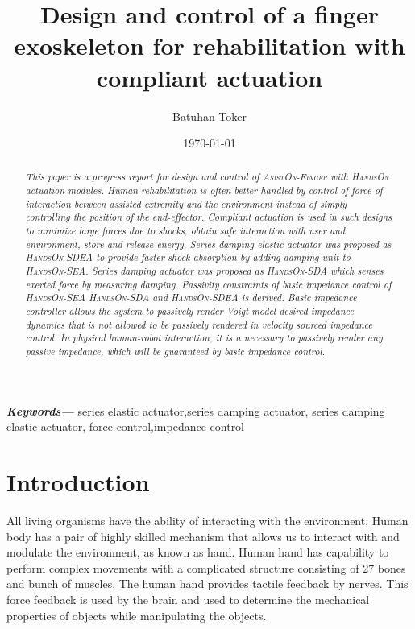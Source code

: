 \documentclass[a4paper,12pt]{article}
\providecommand{\keywords}[1]{\textbf{\textit{Keywords---}} #1}
\begin{document}
\title{Design and control of a finger exoskeleton for rehabilitation with compliant actuation}
\author{Batuhan Toker}
\date{\today}
\maketitle
\begin{abstract}
\emph{This paper is a progress report for design and control of \textsc{AsistOn-Finger} with  \textsc{HandsOn} actuation modules. Human rehabilitation is often better handled by control of force of interaction between assisted extremity and the environment instead of simply controlling the position of the end-effector. Compliant actuation is used in such designs to minimize large forces due to shocks, obtain safe interaction with user and environment, store and release energy. Series damping elastic actuator was proposed as  \textsc{HandsOn-SDEA} to provide faster shock absorption by adding damping unit to \textsc{HandsOn-SEA}. Series damping actuator was proposed as \textsc{HandsOn-SDA} which senses exerted force by measuring damping. Passivity constraints of basic impedance control of \textsc{HandsOn-SEA} \textsc{HandsOn-SDA} and \textsc{HandsOn-SDEA} is derived. Basic impedance controller allows the system to passively render Voigt model desired impedance dynamics that is not allowed to be passively rendered in velocity sourced impedance control. In physical human-robot interaction, it is a necessary to passively render any passive impedance, which will be guaranteed by basic impedance control.}
\end{abstract}
\keywords{series elastic actuator,series damping actuator, series damping elastic actuator, force control,impedance control}

\section{Introduction}

All living organisms have the ability of interacting with the environment. Human body has a pair of highly skilled mechanism that allows us to interact with and modulate the environment, as known as hand. Human hand has capability to perform complex movements with a complicated structure consisting of 27 bones and bunch of muscles. The human hand provides tactile feedback by nerves. This force feedback is used by the brain and used to determine the mechanical properties of objects while manipulating the objects\cite{BIANCHI20188}. 
\end{document}
